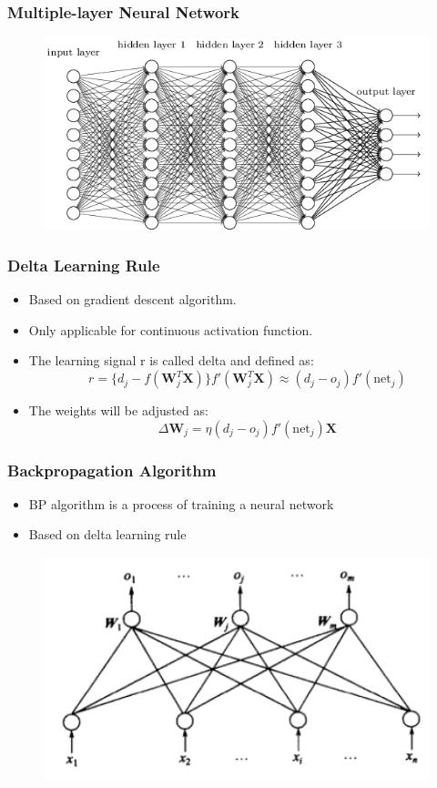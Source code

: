 \documentclass{beamer}
\begin{document}
\begin{frame}
	\frametitle{Multiple-layer Neural Network}
	\begin{figure}
		\includegraphics[width=0.8\linewidth]{multilayer_network.png}
	\end{figure}
\end{frame}

\begin{frame}
	\frametitle{Delta Learning Rule}
\begin{itemize}
	\item Based on gradient descent algorithm.
	\item Only applicable for continuous activation function.
	\item The learning signal r is called delta and defined as:
	\begin{equation*}
	r = \{d_{j} - f(\bm{W}_{j}^{T}\bm{X})\}f'(\bm{W}_{j}^{T}\bm{X}) \approx (d_{j}-o_{j})f'(\text{net}_{j})
	\end{equation*}
	\item The weights will be adjusted as:
	\begin{equation*}
	\Delta \bm{W}_{j} = \eta(d_{j} - o_{j})f'(\text{net}_{j})\bm{X}
	\end{equation*}
	
\end{itemize}
\end{frame}

\begin{frame}
	\frametitle{Backpropagation Algorithm}
	\begin{itemize}
		\item BP algorithm is a process of training a neural network
		\item Based on delta learning rule
	\end{itemize}
	\begin{figure}
		\includegraphics[width=0.8\linewidth]{singlelayer_network.png}
	\end{figure}
\end{frame}
\end{document}

